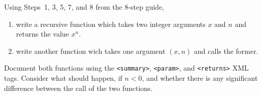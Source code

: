 Using Steps~1, 3, 5, 7, and 8 from the 8-step guide,
\begin{enumerate}
\item write a recursive function which takes two integer arguments $x$ and $n$ and returns the value $x^n$.
\item write another function wich takes one argument $(x,n)$ and calls the former. 
\end{enumerate}
Document both functions using the \verb|<summary>|, \verb|<param>|, and \verb|<returns>| XML tags. Consider what should happen, if $n<0$, and whether there is any significant difference between the call of the two functions.
